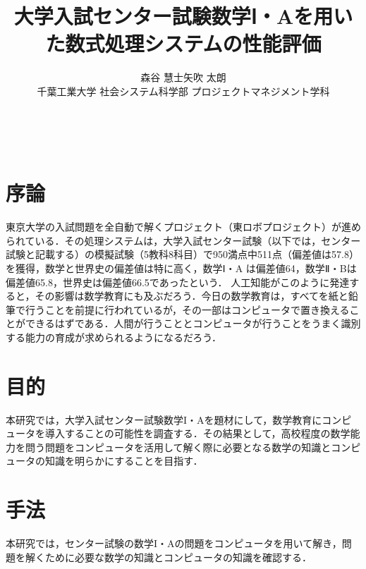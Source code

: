\documentclass[uplatex,twocolumn]{jsarticle}
\title{\vspace{-10mm}\Large{大学入試センター試験数学Ⅰ・Aを用いた数式処理システムの性能評価}\footnotemark[0]}
\author{\large{森谷 慧士\footnotemark[2]\qquad 矢吹 太朗}\\千葉工業大学 社会システム科学部 プロジェクトマネジメント学科\footnotemark[3]}
\date{}
\begin{document}
\twocolumn[\maketitle]
​

\begingroup
\def\thefootnote{\fnsymbol{footnote}}
\endgroup



\section{序論}

東京大学の入試問題を全自動で解くプロジェクト（東ロボプロジェクト）が進められている\cite{arai2014}．その処理システムは，大学入試センター試験（以下では，センター試験と記載する）の模擬試験（5教科8科目）で950満点中511点（偏差値は57.8）を獲得，数学と世界史の偏差値は特に高く，数学Ⅰ・A は偏差値64，数学Ⅱ・Bは偏差値65.8，世界史は偏差値66.5であったという\cite{tourobo}．
人工知能がこのように発達すると，その影響は数学教育にも及ぶだろう．今日の数学教育は，すべてを紙と鉛筆で行うことを前提に行われているが，その一部はコンピュータで置き換えることができるはずである．人間が行うこととコンピュータが行うことをうまく識別する能力の育成が求められるようになるだろう．

\section{目的}

本研究では，大学入試センター試験数学I・Aを題材にして，数学教育にコンピュータを導入することの可能性を調査する．その結果として，高校程度の数学能力を問う問題をコンピュータを活用して解く際に必要となる数学の知識とコンピュータの知識を明らかにすることを目指す．





\section{手法}

本研究では，センター試験の数学I・Aの問題をコンピュータを用いて解き，問題を解くために必要な数学の知識とコンピュータの知識を確認する．
\end{document}

